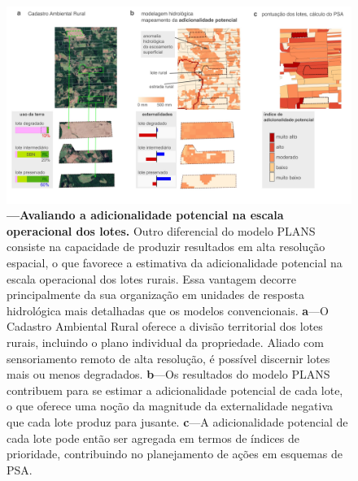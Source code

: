 \documentclass[./main.tex]{subfiles}
\begin{document}
\begin{figure}[t!] 
\centering				
\includegraphics[width=0.98\linewidth]{figs/fig_lotscale.jpg}		
\caption[Adicionalidade na escala operacional dos lotes]
{\textbf{---\;Avaliando a adicionalidade potencial na escala operacional dos lotes.}
    Outro diferencial do modelo PLANS consiste na capacidade de produzir resultados em alta resolução espacial, o que favorece a estimativa da adicionalidade potencial na escala operacional dos lotes rurais. Essa vantagem decorre principalmente da sua organização em unidades de resposta hidrológica mais detalhadas que os modelos convencionais. 
    \;\textbf{a}\;---\;O Cadastro Ambiental Rural oferece a divisão territorial dos lotes rurais, incluindo o plano individual da propriedade. Aliado com sensoriamento remoto de alta resolução, é possível discernir lotes mais ou menos degradados.    
    \;\textbf{b}\;---\;Os resultados do modelo PLANS contribuem para se estimar a adicionalidade potencial de cada lote, o que oferece uma noção da magnitude da externalidade negativa que cada lote produz para jusante.    
    \;\textbf{c}\;---\;A adicionalidade potencial de cada lote pode então ser agregada em termos de índices de prioridade, contribuindo no planejamento de ações em esquemas de PSA.
}
\label{fig:eco:addplans2} 		
\end{figure}
\end{document}
